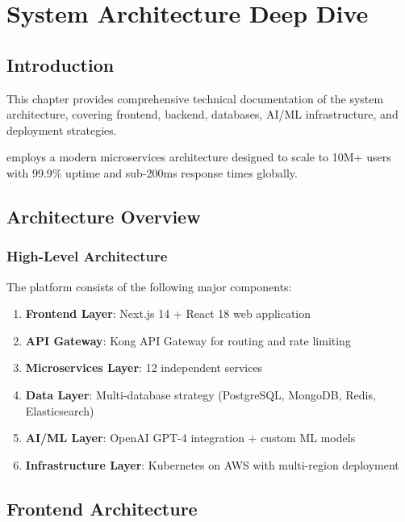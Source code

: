 \chapter{System Architecture Deep Dive}
\label{ch:system-architecture}

\section{Introduction}

This chapter provides comprehensive technical documentation of the \lifeos{} system architecture, covering frontend, backend, databases, AI/ML infrastructure, and deployment strategies.

\begin{keypoint}
\lifeos{} employs a modern microservices architecture designed to scale to 10M+ users with 99.9\% uptime and sub-200ms response times globally.
\end{keypoint}

\section{Architecture Overview}

\subsection{High-Level Architecture}

The \lifeos{} platform consists of the following major components:

\begin{enumerate}
    \item \textbf{Frontend Layer}: Next.js 14 + React 18 web application
    \item \textbf{API Gateway}: Kong API Gateway for routing and rate limiting
    \item \textbf{Microservices Layer}: 12 independent services
    \item \textbf{Data Layer}: Multi-database strategy (PostgreSQL, MongoDB, Redis, Elasticsearch)
    \item \textbf{AI/ML Layer}: OpenAI GPT-4 integration + custom ML models
    \item \textbf{Infrastructure Layer}: Kubernetes on AWS with multi-region deployment
\end{enumerate}

\section{Frontend Architecture}

